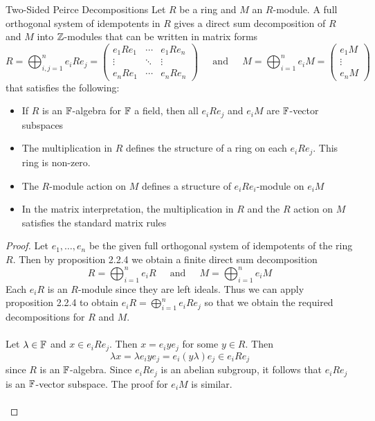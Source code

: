 \documentclass[a4paper]{article}
\begin{document}
\begin{thm}{Two-Sided Peirce Decompositions}{} Let $R$ be a ring and $M$ an $R$-module. A full orthogonal system of idempotents in $R$ gives a direct sum decomposition of $R$ and $M$ into $\mathbb{Z}$-modules that can be written in matrix forms $$R=\bigoplus_{i,j=1}^n e_iRe_j=\begin{pmatrix}
e_1Re_1 & \cdots & e_1Re_n\\
\vdots & \ddots & \vdots\\
e_nRe_1 & \cdots & e_nRe_n
\end{pmatrix}\;\;\;\;\text{ and }\;\;\;\;M=\bigoplus_{i=1}^ne_iM=\begin{pmatrix}
e_1M\\
\vdots\\
e_nM
\end{pmatrix}$$ that satisfies the following: 
\begin{itemize}
\item If $R$ is an $\mathbb{F}$-algebra for $\mathbb{F}$ a field, then all $e_iRe_j$ and $e_iM$ are $\mathbb{F}$-vector subspaces
\item The multiplication in $R$ defines the structure of a ring on each $e_iRe_j$. This ring is non-zero. 
\item The $R$-module action on $M$ defines a structure of $e_iRe_i$-module on $e_iM$
\item In the matrix interpretation, the multiplication in $R$ and the $R$ action on $M$ satisfies the standard matrix rules
\end{itemize} \tcbline
\begin{proof}
Let $e_1,\dots,e_n$ be the given full orthogonal system of idempotents of the ring $R$.  Then by proposition 2.2.4 we obtain a finite direct sum decomposition $$R=\bigoplus_{i=1}^ne_iR\;\;\;\;\text{ and }\;\;\;\;M=\bigoplus_{i=1}^ne_iM$$ Each $e_iR$ is an $R$-module since they are left ideals. Thus we can apply proposition 2.2.4 to obtain $e_iR=\bigoplus_{i=1}^ne_iRe_j$ so that we obtain the required decompositions for $R$ and $M$. \\~\\

Let $\lambda\in\mathbb{F}$ and $x\in e_iRe_j$. Then $x=e_iye_j$ for some $y\in R$. Then $$\lambda x=\lambda e_iye_j=e_i(y\lambda)e_j\in e_iRe_j$$ since $R$ is an $\mathbb{F}$-algebra. Since $e_iRe_j$ is an abelian subgroup, it follows that $e_iRe_j$ is an $\mathbb{F}$-vector subspace. The proof for $e_iM$ is similar. \\~\\


\end{proof}
\end{thm}
\end{document}
